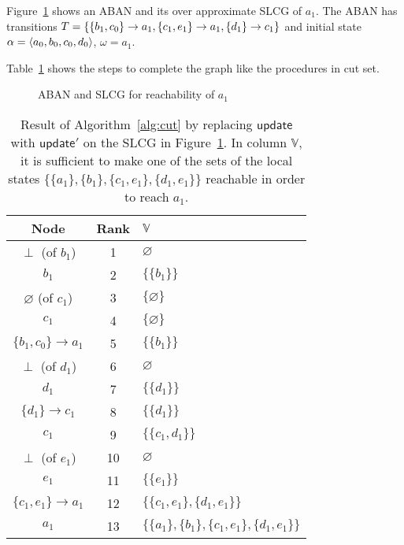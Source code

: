 \begin{example}
Figure~\ref{fig:completionSet} shows an ABAN and its over approximate SLCG of $a_1$.
The ABAN has transitions $T=\{\acm{b_1,c_0}{a_0}{a_1}, \acm{c_1, e_1}{a_0}{a_1}, \acm{d_1}{c_0}{c_1}\}$ and initial state $\alpha=\init{a_0,b_0,c_0,d_0}$, $\omega = a_1$.

Table~\ref{tab:completionset} shows the steps to complete the graph like the procedures in cut set.

\begin{figure}[ht]
    \centering
    
    \caption[Completion set]{ABAN and SLCG for reachability of $a_1$}
    \label{fig:completionSet}
\end{figure}



\begin{table}[ht]
\centering
\begin{tabular}{|c|c|l|}
 \hline 
 Node & Rank & $\mathbb{V}$ \\ 
 \hline 
 $\perp$ (of $b_1$) & 1 & $\varnothing$ \\ 
 \hline 
 $b_1$ & 2 & $\{\{b_1\}\}$ \\ 
 \hline 
 $\varnothing$ (of $c_1$) & 3 & $\{\varnothing\}$ \\ 
 \hline 
 $c_1$ & 4 & $\{\varnothing\}$ \\ 
 \hline 
 $\{b_1,c_0\}\to a_1$ & 5 & $\{\{b_1\}\}$ \\ 
 \hline 
 $\perp$ (of $d_1$) & 6 & $\varnothing$ \\ 
 \hline 
 $d_1$ & 7 & $\{\{d_1\}\}$ \\ 
 \hline 
 $\{d_1\}\to c_1$ & 8 & $\{\{d_1\}\}$ \\ 
 \hline 
 $c_1$ & 9 & $\{\{c_1, d_1\}\}$ \\ 
 \hline 
 $\perp$ (of $e_1$) & 10 & $\varnothing$ \\ 
 \hline 
 $e_1$ & 11 & $\{\{e_1\}\}$ \\ 
 \hline 
 $\{c_1,e_1\}\to a_1$ & 12 & $\{\{c_1, e_1\}, \{d_1, e_1\}\}$ \\ 
 \hline 
 $a_1$ & 13 & $\{\{a_1\}, \{b_1\}, \{c_1, e_1\}, \{d_1, e_1\}\}$ \\ 
 \hline 
 \end{tabular}
 \caption[Example of completion set]{Result of Algorithm~\ref{alg:cut} by replacing $\mathsf{update}$ with $\mathsf{update'}$ on the SLCG in Figure~\ref{fig:completionSet}.
 In column $\mathbb{V}$, it is sufficient to make one of the sets of the local states $\{\{a_1\}, \{b_1\}, \{c_1, e_1\}, \{d_1, e_1\}\}$ reachable in order to reach $a_1$.}\label{tab:completionset}
\end{table}
\end{example}



